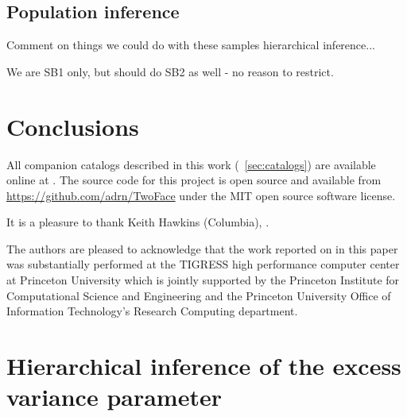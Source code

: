 \documentclass[modern, letterpaper]{aastex62}
\newcommand{\apogee}{\project{\acronym{APOGEE}}}
\newcommand{\sdssiv}{\project{\acronym{SDSS-IV}}}
\begin{document}
\subsection{Population inference}



Comment on things we could do with these samples hierarchical inference...

We are SB1 only, but should do SB2 as well - no reason to restrict.

\section{Conclusions}

All companion catalogs described in this work (\sectionname~\ref{sec:catalogs})
are available online at .
The source code for this project is open source and available from
\url{https://github.com/adrn/TwoFace} under the MIT open source software
license.

\acknowledgements

It is a pleasure to thank Keith Hawkins (Columbia), .

The authors are pleased to acknowledge that the work reported on in this
paper was substantially performed at the TIGRESS high performance computer
center at Princeton University which is jointly supported by the Princeton
Institute for Computational Science and Engineering and the Princeton
University Office of Information Technology's Research Computing department.


\facility{\sdssiv, \apogee}

\clearpage




\appendix
\section{Hierarchical inference of the excess variance parameter}
\label{sec:hierarch}
\end{document}
